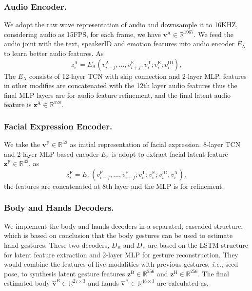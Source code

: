 \documentclass[runningheads]{llncs}
\begin{document}
\vspace{-0.5cm}
\subsubsection{Audio Encoder.}
We adopt the raw wave representation of audio and downsample it to 16KHZ, considering audio as 15FPS, for each frame, we have $\textbf{v}^\text{A} \in \mathbb{R}^{1067}$. We feed the audio joint with the text, speakerID and emotion features into audio encoder $E_\text{A}$ to learn better audio features. As 
\begin{equation}
    z^\text{A}_{i} = E_\text{A}(v^\text{A}_{i-f}, ..., v^\text{E}_{i+f}; v^\text{T}_{i}; v^\text{E}_{i}; v^\text{ID}_{i}), 
    \label{eq4}
\end{equation} The $E_\text{A}$ consists of 12-layer TCN with skip connection and 2-layer MLP, features in other modifies are concatenated with the 12th layer audio features thus the final MLP layers are for audio feature refinement, and the final latent audio feature is $\textbf{z}^\text{A} \in \mathbb{R}^{128}$. 

\vspace{-0.5cm}
\subsubsection{Facial Expression Encoder.} We take the $\textbf{v}^\text{F} \in \mathbb{R}^{52}$ as initial representation of facial expression. 8-layer TCN and 2-layer MLP based encoder $E_\text{F}$ is adopt to extract facial latent feature $\textbf{z}^\text{F} \in \mathbb{R}^{32} $, as 
\begin{equation}
    z^\text{F}_{i} = E_\text{F}(v^\text{F}_{i-f}, ..., v^\text{F}_{i+f}; v^\text{T}_{i}; v^\text{E}_{i}; v^\text{ID}_{i}; v^\text{A}_{i}), 
    \label{eq5}
\end{equation}
the features are concatenated at 8th layer and the MLP is for refinement.


\vspace{-0.5cm}
\subsubsection{Body and Hands Decoders.} We implement the body and hands decoders in a separated, cascaded structure, which is based on \cite{ng2021body2hands} conclusion that the body gestures can be used to estimate hand gestures. These two decoders, $D_\text{B}$ and $D_\text{F}$ are based on the LSTM structure for latent feature extraction and 2-layer MLP for gesture reconstruction. They would combine the features of five modalities with previous gestures, \textit{i.e.}, seed pose, to synthesis latent gesture features $\textbf{z}^\text{B} \in \mathbb{R}^{256}$ and $\textbf{z}^\text{H} \in \mathbb{R}^{256}$. The final estimated body $\hat{\textbf{v}}^\text{B} \in \mathbb{R}^{27\times3}$ and hands $\hat{\textbf{v}}^\text{H} \in \mathbb{R}^{48\times3}$ are calculated as, 
\end{document}
